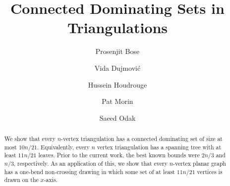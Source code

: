 \documentclass[12pt]{article}
\title{Connected Dominating Sets in Triangulations}
\author{Prosenjit Bose \and Vida Dujmović \and Hussein Houdrouge \and Pat Morin \and Saeed Odak}
\theoremstyle{definition}
\newcommand{\vida}[1]{[{\color{pink}VD: #1}]}
\newcommand{\saeed}[1]{[{\color{cyan}SO: #1}]}
\begin{document}
\maketitle

\begin{abstract}
  We show that every $n$-vertex triangulation has a connected dominating set of size at most $10n/21$.  Equivalently, every $n$ vertex triangulation has a spanning tree with at least $11n/21$ leaves. Prior to the current work, the best known bounds were $2n/3$ and $n/3$, respectively.  As an application of this, we show that every $n$-vertex planar graph has a one-bend non-crossing drawing in which some set of at least $11n/21$ vertices is drawn on the $x$-axis.
\end{abstract}




\end{document}
